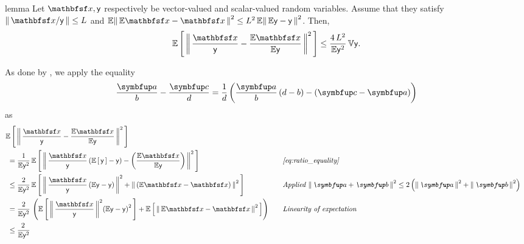 \begin{theoremEnd}{lemma}\label{thm:ratio_variance_bound}
  Let \(\rvvx, \rvy\) respectively be vector-valued and scalar-valued random variables.
  Assume that they satisfy \(\norm{\rvvx/\rvy} \leq L\) and \(\mathbb{E}\norm{\mathbb{E}\rvvx - \rvvx}^2 \leq L^2\,\mathbb{E}\norm{\mathbb{E}\rvy - \rvy}^2 \).
  Then,
  \begin{align*}
    \E{
      \norm{
        \frac{\rvvx}{\rvy}
        -
        \frac{\mathbb{E}\rvvx}{\mathbb{E}\rvy}
      }^2
    }
    \leq
    \frac{4\,L^2}{\mathbb{E}\rvy^2}\,
    \mathbb{V}{
      \rvy
    }.
  \end{align*}
\end{theoremEnd}
\begin{proofEnd}
  As done by \citet{10.1214/17-STS611, cardoso_brsnis_2022}, we apply the equality
  \begin{align}
    \frac{\va}{b} - \frac{\vc}{d}
    = \frac{1}{d} \left( \frac{\va}{b}\left(d - b\right) - \left(\vc - \va\right)\right) 
    \label{eq:ratio_equality}
  \end{align}
  as
  \begin{alignat}{2}
    &\E{
      \norm{
        \frac{\rvvx}{\rvy}
        -
        \frac{\mathbb{E}\rvvx}{\mathbb{E}\rvy}
      }^2
    }
    \nonumber
    \\
    &\;=
    \frac{1}{\mathbb{E}\rvy^2}\,
    \E{
      \norm{
        \frac{\rvvx}{\rvy}
        \left(
        \E{\rvy} - \rvy
        \right)
        -
        \left(
        \frac{\mathbb{E}\rvvx}{\mathbb{E}\rvy}
        \right)
      }^2
    }
    &&\quad\text{\textit{\cref{eq:ratio_equality}}}
    \nonumber
    \\
    &\;\leq
    \frac{2}{\mathbb{E}\rvy^2}\,
    \E{
      \norm{
        \frac{\rvvx}{\rvy}
        \left(
        \mathbb{E}\rvy - \rvy
        \right)
      }^2
      +
      \norm{
        \left(
        \mathbb{E}\rvvx - \rvvx
        \right)
      }^2
    }
    &&\quad\text{\textit{Applied \(\norm{\va + \vb}^2 \leq 2\left(\norm{\va}^2 + \norm{\vb}^2\right)\)}}
    \nonumber
    \\
    &\;=
    \frac{2}{\mathbb{E}\rvy^2}\,
    \left(
    \E{
      \norm{
        \frac{\rvvx}{\rvy}
      }^2
      {\left(
        \mathbb{E}\rvy - \rvy
      \right)}^2
    }
    +
    \E{
      \norm{
        \mathbb{E}\rvvx - \rvvx
      }^2
    }
    \right)
    &&\quad\text{\textit{Linearity of expectation}}
    \nonumber
    \\
    &\;\leq
    \frac{2\,}{\mathbb{E}\rvy^2}\,

\end{alignat}
\end{proofEnd}
